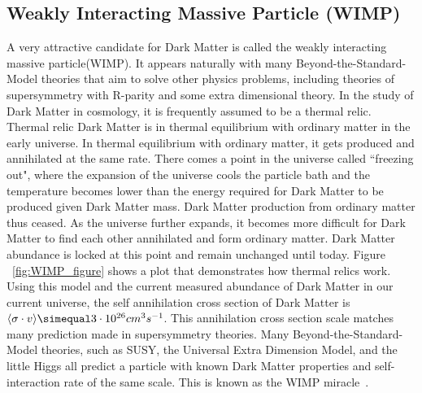 \subsection{Weakly Interacting Massive Particle (WIMP)}
A very attractive candidate for Dark Matter is called the weakly interacting massive particle(WIMP). It appears naturally with many Beyond-the-Standard-Model theories that aim to solve other physics problems, including theories of supersymmetry with R-parity and some extra dimensional theory. 
In the study of Dark Matter in cosmology, it is frequently assumed to be a thermal relic. Thermal relic Dark Matter is in thermal equilibrium with ordinary matter in the early universe. In thermal equilibrium with ordinary matter, it gets produced and annihilated at the same rate. There comes a point in the universe called ``freezing out", where the expansion of the universe cools the particle bath and the temperature becomes lower than the energy required for Dark Matter to be produced given
Dark Matter mass. Dark Matter production from ordinary matter thus ceased. As the universe further expands, it becomes more difficult for Dark Matter to find each other annihilated and form ordinary matter. Dark Matter abundance is locked at this point and remain unchanged until today. Figure ~\ref{fig:WIMP_figure} shows a plot that demonstrates how thermal relics work. Using this model and the current measured abundance of Dark Matter in our current universe, the self annihilation cross section of Dark Matter is $ \langle \sigma \cdot v \rangle \simequal 3 \cdot 10^{26}cm^{3} s^{-1}$. This annihilation cross section scale matches many prediction made in supersymmetry theories. Many Beyond-the-Standard-Model theories, such as SUSY, the Universal Extra Dimension Model, and the little Higgs all predict a particle with known Dark Matter properties and self-interaction rate of the same scale. This is known as the WIMP miracle~\cite{Dev_2014}.



